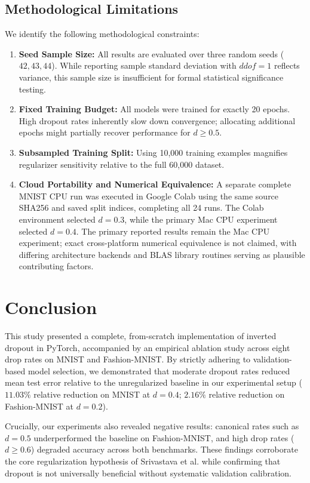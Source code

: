 \documentclass[conference]{IEEEtran}
\begin{document}
\subsection{Methodological Limitations}
We identify the following methodological constraints:
\begin{enumerate}\setlength{\itemsep}{0pt}\setlength{\parskip}{0pt}
\item \textbf{Seed Sample Size:} All results are evaluated over three random seeds ($42, 43, 44$). While reporting sample standard deviation with $ddof=1$ reflects variance, this sample size is insufficient for formal statistical significance testing.
\item \textbf{Fixed Training Budget:} All models were trained for exactly 20 epochs. High dropout rates inherently slow down convergence; allocating additional epochs might partially recover performance for $d \ge 0.5$.
\item \textbf{Subsampled Training Split:} Using 10,000 training examples magnifies regularizer sensitivity relative to the full 60,000 dataset.
\item \textbf{Cloud Portability and Numerical Equivalence:} A separate complete MNIST CPU run was executed in Google Colab using the same source SHA256 and saved split indices, completing all 24 runs. The Colab environment selected $d=0.3$, while the primary Mac CPU experiment selected $d=0.4$. The primary reported results remain the Mac CPU experiment; exact cross-platform numerical equivalence is not claimed, with differing architecture backends and BLAS library routines serving as plausible contributing factors.
\end{enumerate}

\section{Conclusion}
This study presented a complete, from-scratch implementation of inverted dropout in PyTorch, accompanied by an empirical ablation study across eight drop rates on MNIST and Fashion-MNIST. By strictly adhering to validation-based model selection, we demonstrated that moderate dropout rates reduced mean test error relative to the unregularized baseline in our experimental setup ($11.03\%$ relative reduction on MNIST at $d=0.4$; $2.16\%$ relative reduction on Fashion-MNIST at $d=0.2$). 

Crucially, our experiments also revealed negative results: canonical rates such as $d=0.5$ underperformed the baseline on Fashion-MNIST, and high drop rates ($d \ge 0.6$) degraded accuracy across both benchmarks. These findings corroborate the core regularization hypothesis of Srivastava et al. while confirming that dropout is not universally beneficial without systematic validation calibration.
\end{document}
